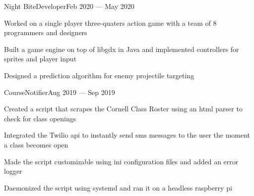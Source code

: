 \documentclass{resume}
\begin{document}
\begin{projects}
    \begin{entry}{Night Bite}{Developer}{Feb 2020 --- May 2020}
        \begin{description}
            \item Worked on a single player three-quaters action game with a
                team of 8 programmers and designers
            \item Built a game engine on top of libgdx in Java and implemented
                controllers for sprites and player input
            \item Designed a prediction algorithm for enemy projectile
                targeting
        \end{description}
    \end{entry}


    \begin{entry}{CourseNotifier}{}{Aug 2019 --- Sep 2019}
        \begin{description}
            \item Created a script that scrapes the Cornell Class Roster
                using an html parser to check for class openings
            \item Integrated the Twilio api to instantly send sms messages to
                the user the moment a class becomes open
            \item Made the script customizable using ini configuration files and
                added an error logger
            \item Daemonized the script using systemd and ran it on a headless
                raspberry pi
        \end{description}
    \end{entry}

\end{projects}
\end{document}
